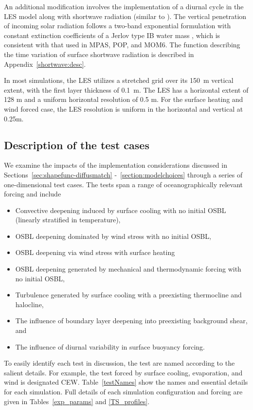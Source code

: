 \documentclass[preprint,12pt,authoryear]{agujournal}
\begin{document}
An additional modification involves the implementation of a diurnal cycle in the LES model along with shortwave radiation (similar to \citealp{Wang1998}).  The vertical penetration of incoming solar radiation follows a two-band exponential formulation with constant extinction coefficients of a Jerlov type IB water mass \citep{Paulson1977}, which is consistent with that used in MPAS, POP, and MOM6.  The function describing the time variation of surface shortwave radiation is described in Appendix~\ref{shortwave:desc}.

In most simulations, the LES utilizes a stretched grid over its 150~m vertical extent, with the first layer thickness of 0.1~m.  The LES has a horizontal extent of 128 m and a uniform horizontal resolution of 0.5 m.  For the surface heating and wind forced case, the LES resolution is uniform in the horizontal and vertical at 0.25m.

\subsection{Description of the test cases}
\label{subsection:test-case-introduction}

We examine the impacts of the implementation considerations discussed in Sections~\ref{sec:shapefunc-diffusmatch} -~\ref{section:modelchoices} through a series of one-dimensional test cases.  The tests span a range of oceanographically relevant forcing and include
\begin{itemize}
\item Convective deepening induced by surface cooling with no initial OSBL (linearly stratified in temperature),
\item OSBL deepening dominated by wind stress with no initial OSBL,
\item OSBL deepening via wind stress with surface heating
\item OSBL deepening generated by mechanical and thermodynamic forcing with no initial OSBL,
\item Turbulence generated by surface cooling with a preexisting thermocline and halocline,
\item The influence of boundary layer deepening into preexisting background shear, and
\item The influence of diurnal variability in surface buoyancy forcing.
\end{itemize} 

To easily identify each test in discussion, the test are named according to the salient details.  For example, the test forced by surface cooling, evaporation, and wind is designated CEW.  Table~\ref{testNames} show the names and essential details for each simulation.  Full details of each simulation configuration and forcing are given in Tables~\ref{exp_params} and \ref{TS_profiles}.
\end{document}
